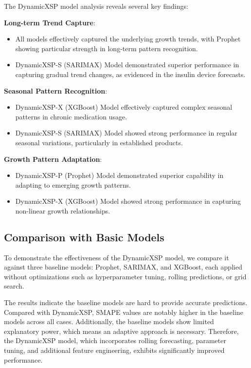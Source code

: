 \documentclass[12pt]{article}
\begin{document}
The DynamicXSP model analysis reveals several key findings:

\textbf{Long-term Trend Capture}:
\begin{itemize}
\item All models effectively captured the underlying growth trends, with Prophet showing particular strength in long-term pattern recognition.
\item DynamicXSP-S (SARIMAX) Model demonstrated superior performance in capturing gradual trend changes, as evidenced in the insulin device forecasts.
\end{itemize}

\textbf{Seasonal Pattern Recognition}:
\begin{itemize}
\item DynamicXSP-X (XGBoost) Model effectively captured complex seasonal patterns in chronic medication usage.
\item DynamicXSP-S (SARIMAX) Model showed strong performance in regular seasonal variations, particularly in established products.
\end{itemize}

\textbf{Growth Pattern Adaptation}:
\begin{itemize}
\item DynamicXSP-P (Prophet) Model demonstrated superior capability in adapting to emerging growth patterns.
\item DynamicXSP-X (XGBoost) Model showed strong performance in capturing non-linear growth relationships.
\end{itemize}

\subsection{Comparison with Basic Models}

To demonstrate the effectiveness of the DynamicXSP model, we compare it against three baseline models: Prophet, SARIMAX, and XGBoost, each applied without optimizations such as hyperparameter tuning, rolling predictions, or grid search.

The results indicate the baseline models are hard to provide accurate predictions. Compared with DynamicXSP, SMAPE values are notably higher in the baseline models across all cases. Additionally, the baseline models show limited explanatory power, which means an adaptive approach is necessary. Therefore, the DynamicXSP model, which incorporates rolling forecasting, parameter tuning, and additional feature engineering, exhibits significantly improved performance. 
\end{document}
